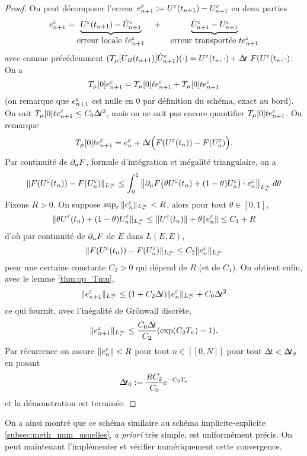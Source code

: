 \begin{proof}
On peut décomposer l'erreur $e_{n+1}^{\varepsilon} := U^{\varepsilon}(t_{n+1}) - U_{n+1}^{\varepsilon}$ en deux parties
$$ e_{n+1}^{\varepsilon} = \underbrace{U^{\varepsilon}(t_{n+1}) - \hat{U}_{n+1}^{\varepsilon}}_{\displaystyle \text{erreur locale } \ell e_{n+1}^{\varepsilon}}
\quad + \quad 
\underbrace{\hat{U}_{n+1}^{\varepsilon} - U_{n+1}^{\varepsilon}}_{\displaystyle \text{erreur transportée } t e_{n+1}^{\varepsilon}} $$
avec comme précédemment $(T_{\mu}[U_B(t_{n+1})]\hat{U}_{n+1}^{\varepsilon})(\cdot) = U^{\varepsilon}(t_n,\cdot) + \Delta\!\!\!\ t\ F(U^{\varepsilon}(t_n,\cdot) $. On a 
$$ T_{\mu}[0] e_{n+1}^{\varepsilon} = T_{\mu}[0]\ell e_{n+1}^{\varepsilon} + T_{\mu}[0]t e_{n+1}^{\varepsilon} $$
(on remarque que $e_{n+1}^{\varepsilon}$ est nulle en 0 par définition du schéma, exact au bord). On sait $T_{\mu}[0]\ell e_{n+1}^{\varepsilon} \leq C_0\Delta\!\!\!\ t^2$, mais on ne sait pas encore quantifier $T_{\mu}[0] t e_{n+1}^{\varepsilon}$. On remarque 
$$ T_{\mu}[0] t e_{n+1}^{\varepsilon} = e_n^{\varepsilon} + \Delta\!\!\!\ t \Big( F(U^{\varepsilon}(t_n)) - F(U_n^{\varepsilon}) \Big). $$
Par continuité de $\partial_{u} F$, formule d'intégration et inégalité triangulaire, on a 
$$ \|F(U^{\varepsilon}(t_n)) - F(U_n^{\varepsilon}) \|_{L^{\infty}_{\tau}} \leq \int_0^1 \left\|\partial_{u} F \big(\theta U^{\varepsilon}(t_n) + (1-\theta)U_n^{\varepsilon}\big) \cdot e_n^{\varepsilon} \right\|_{L^{\infty}_{\tau}} d\theta $$
Fixons $R > 0$. On suppose $\sup_{\varepsilon} \|e_n^{\varepsilon}\|_{L^{\infty}_{\tau}} < R$, alors pour tout $\theta\in [0,1]$, 
$$\| \theta U^{\varepsilon}(t_n) + (1-\theta) U^{\varepsilon}_n \|_{L^{\infty}_{\tau}} \leq \|U^{\varepsilon}(t_n)\| + \theta\|e_n^{\varepsilon}\| \leq C_1 + R $$
d'où par continuité de $\partial_{u} F$ de $E$ dans $L(E,E)$, 
$$ \|F(U^{\varepsilon}(t_n))-F(U_n^{\varepsilon})\|_{L^{\infty}_{\tau}} \leq C_2 \|e_n^{\varepsilon}\|_{L^{\infty}_{\tau}} $$
pour une certaine constante $C_2 > 0$ qui dépend de $R$ (et de $C_1$). On obtient enfin, avec le lemme \ref{thm:op_Tmu}, 
$$ \|e_{n+1}^{\varepsilon} \|_{L^{\infty}_{\tau}} \leq (1+C_2\Delta\!\!\!\ t)\|e_n^{\varepsilon}\|_{L^{\infty}_{\tau}} + C_0\Delta\!\!\!\ t^2 $$
ce qui fournit, avec l'inégalité de Grönwall discrète, 
$$ \|e_{n+1}^{\varepsilon}\|_{L^{\infty}_{\tau}} \leq \frac{C_0\Delta\!\!\!\ t}{C_2} (\exp(C_2 T_{\kappa}) - 1). $$
Par récurrence on assure $\|e_n^{\varepsilon}\| < R$ pour tout $n\in [\![0,N]\!]$ pour tout $\Delta\!\!\!\ t < \Delta\!\!\!\ t_0$ en posant 
$$ \Delta\!\!\!\ t_0 := \frac{RC_2}{C_0}e^{-C_2T_{\kappa}} $$
et la démonstration est terminée. 
\end{proof}

On a ainsi montré que ce schéma similaire au schéma implicite-explicite \ref{subsec:meth_num_usuelles}, \textit{a priori} très simple, est uniformément précis. 
On peut maintenant l'implémenter et vérifier numériquement cette convergence. 